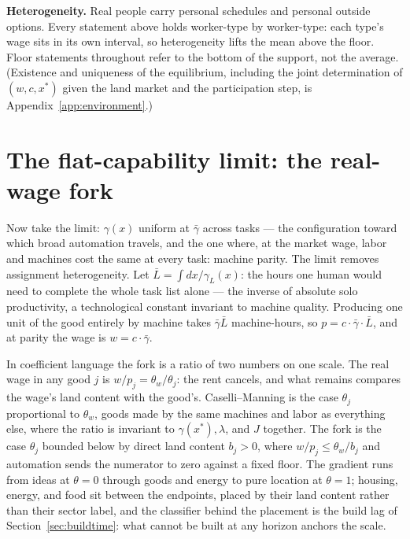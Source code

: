 \documentclass[12pt]{article}
\theoremstyle{plain}
\begin{document}
\textbf{Heterogeneity.} Real people carry personal schedules and personal outside options. Every statement above holds worker-type by worker-type: each type's wage sits in its own interval, so heterogeneity lifts the mean above the floor. Floor statements throughout refer to the bottom of the support, not the average. (Existence and uniqueness of the equilibrium, including the joint determination of $(w, c, x^*)$ given the land market and the participation step, is Appendix~\ref{app:environment}.)

\section{The flat-capability limit: the real-wage fork}\label{sec:limit}

Now take the limit: $\gamma (x)$ uniform at $\bar{\gamma}$ across tasks --- the configuration toward which broad automation travels, and the one where, at the market wage, labor and machines cost the same at every task: machine parity. The limit removes assignment heterogeneity. Let $\bar{L} = \int dx/\gamma _L(x)$: the hours one human would need to complete the whole task list alone --- the inverse of absolute solo productivity, a technological constant invariant to machine quality. Producing one unit of the good entirely by machine takes $\bar{\gamma}\bar{L}$ machine-hours, so $p = c\cdot \bar{\gamma}\cdot \bar{L}$, and at parity the wage is $w = c\cdot \bar{\gamma}$.

In coefficient language the fork is a ratio of two numbers on one scale. The real wage in any good $j$ is $w/p_j = \theta _w/\theta _j$: the rent cancels, and what remains compares the wage's land content with the good's. Caselli--Manning is the case $\theta _j$ proportional to $\theta _w$, goods made by the same machines and labor as everything else, where the ratio is invariant to $\gamma (x^*), \lambda$, and $J$ together. The fork is the case $\theta _j$ bounded below by direct land content $b_j > 0$, where $w/p_j \le \theta _w/b_j$ and automation sends the numerator to zero against a fixed floor. The gradient runs from ideas at $\theta = 0$ through goods and energy to pure location at $\theta = 1$; housing, energy, and food sit between the endpoints, placed by their land content rather than their sector label, and the classifier behind the placement is the build lag of Section~\ref{sec:buildtime}: what cannot be built at any horizon anchors the scale.
\end{document}
